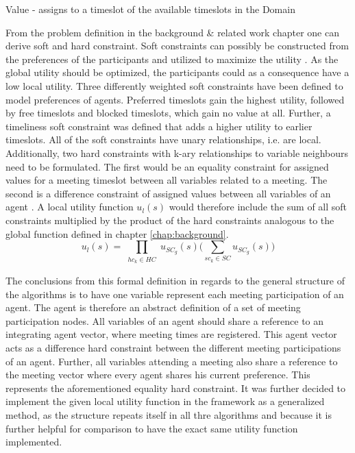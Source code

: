 \begin{hardconstraint2}
Value - assigns to a timeslot of the available timeslots in the Domain
\end{hardconstraint2}
From the problem definition in the background \& related work chapter one can derive soft and hard constraint. Soft constraints can possibly be constructed from the preferences of the participants and utilized to maximize the utility \cite{Franzin}. As the global utility should be optimized, the participants could as a consequence have a low local utility. Three differently weighted soft constraints have been defined to model preferences of agents. Preferred timeslots gain the highest utility, followed by free timeslots and blocked timeslots, which gain no value at all. Further, a timeliness soft constraint was defined that adds a higher utility to earlier timeslots. All of the soft constraints have unary relationships, i.e. are local. %
Additionally, two hard constraints with k-ary relationships to variable neighbours need to be formulated. The first would be an equality constraint for assigned values for a meeting timeslot between all variables related to a meeting. The second is a difference constraint of assigned values between all variables of an agent \cite{Farinelli, Angulo}.
\newline\newline
A local utility function \(u_{l}(s)\) would therefore include the sum of all soft constraints multiplied by the product of the hard constraints analogous to the global function defined in chapter {\ref{chap:background}}. 
\[ u_{l}(s) = \prod_{\substack{hc_{k} \in HC}} u_{SC_{g}}(s) \bigg( \sum_{sc_{k} \in SC} u_{SC_{g}}(s) \bigg)\] 

The conclusions from this formal definition in regards to the general structure of the algorithms is to have one variable represent each meeting participation of an agent. The agent is therefore an abstract definition of a set of meeting participation nodes. All variables of an agent should share a reference to an integrating agent vector, where meeting times are registered. This agent vector acts as a difference hard constraint between the different meeting participations of an agent. Further, all variables attending a meeting also share a reference to the meeting vector where every agent shares his current preference. This represents the aforementioned equality hard constraint. It was further decided to implement the given local utility function in the framework as a generalized method, as the structure repeats itself in all thre algorithms and because it is further helpful for comparison to have the exact same utility function implemented.

